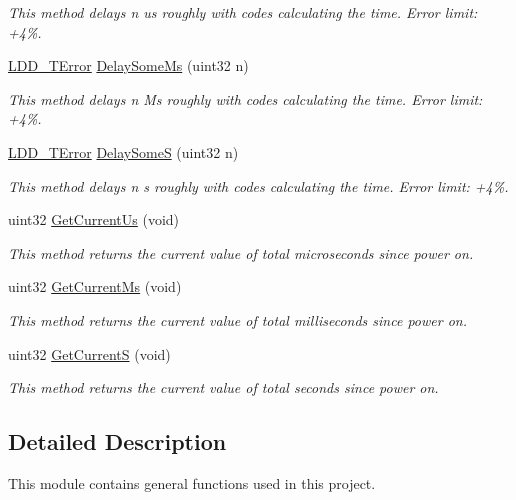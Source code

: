 \begin{DoxyCompactItemize}
\begin{DoxyCompactList}\small\item\em This method delays n us roughly with codes calculating the time. Error limit\-: +4\%. \end{DoxyCompactList}\item 
\hyperlink{group___p_e___types__module_ga24c2b045fd04e79e85f261ce4df35588}{L\-D\-D\-\_\-\-T\-Error} \hyperlink{group___uti_ga9e773733f9f8678fa7f54e54c7e3f316}{Delay\-Some\-Ms} (uint32 n)
\begin{DoxyCompactList}\small\item\em This method delays n Ms roughly with codes calculating the time. Error limit\-: +4\%. \end{DoxyCompactList}\item 
\hyperlink{group___p_e___types__module_ga24c2b045fd04e79e85f261ce4df35588}{L\-D\-D\-\_\-\-T\-Error} \hyperlink{group___uti_ga52aa6208719074d7cd10fe2a42d6d0c7}{Delay\-Some\-S} (uint32 n)
\begin{DoxyCompactList}\small\item\em This method delays n s roughly with codes calculating the time. Error limit\-: +4\%. \end{DoxyCompactList}\item 
uint32 \hyperlink{group___uti_ga7b6649d282c8abf3613f1ed8e7ef4c34}{Get\-Current\-Us} (void)
\begin{DoxyCompactList}\small\item\em This method returns the current value of total microseconds since power on. \end{DoxyCompactList}\item 
uint32 \hyperlink{group___uti_ga231cbdb58ac0905883e23f1814de2549}{Get\-Current\-Ms} (void)
\begin{DoxyCompactList}\small\item\em This method returns the current value of total milliseconds since power on. \end{DoxyCompactList}\item 
uint32 \hyperlink{group___uti_gaffe959d82d984dc88cd02a4894d02a7c}{Get\-Current\-S} (void)
\begin{DoxyCompactList}\small\item\em This method returns the current value of total seconds since power on. \end{DoxyCompactList}\end{DoxyCompactItemize}


\subsection{Detailed Description}
This module contains general functions used in this project. 

